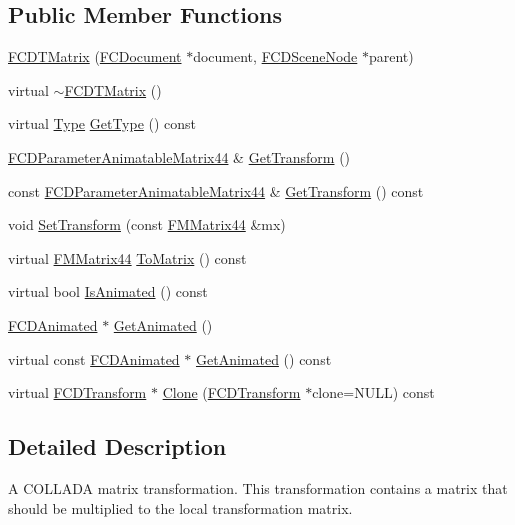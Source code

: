\subsection*{Public Member Functions}
\begin{DoxyCompactItemize}
\item 
\hyperlink{classFCDTMatrix_abfe3f4dfeab74692152c34d2af3e0999}{FCDTMatrix} (\hyperlink{classFCDocument}{FCDocument} $\ast$document, \hyperlink{classFCDSceneNode}{FCDSceneNode} $\ast$parent)
\item 
virtual \hyperlink{classFCDTMatrix_abe118d75966fab2155ac04bf73a4681c}{$\sim$FCDTMatrix} ()
\item 
virtual \hyperlink{classFCDTransform_a13e561c5e53aeaf84dedf4661cdc8921}{Type} \hyperlink{classFCDTMatrix_a73abaf07dc65e188ceb14d49e27355ee}{GetType} () const 
\item 
\hyperlink{classFCDParameterAnimatableT}{FCDParameterAnimatableMatrix44} \& \hyperlink{classFCDTMatrix_a44021172638ab8ae2c1c0c56d2c88ebc}{GetTransform} ()
\item 
const \hyperlink{classFCDParameterAnimatableT}{FCDParameterAnimatableMatrix44} \& \hyperlink{classFCDTMatrix_a09a0316070f5f57d4f59cf25adf4bd64}{GetTransform} () const 
\item 
void \hyperlink{classFCDTMatrix_a9ad2ef293251bedafb477ea7fa624021}{SetTransform} (const \hyperlink{classFMMatrix44}{FMMatrix44} \&mx)
\item 
virtual \hyperlink{classFMMatrix44}{FMMatrix44} \hyperlink{classFCDTMatrix_a26384eeccaa1205b0f88d0ad16134669}{ToMatrix} () const 
\item 
virtual bool \hyperlink{classFCDTMatrix_aaed758f82370d47c82eb66263830d610}{IsAnimated} () const 
\item 
\hyperlink{classFCDAnimated}{FCDAnimated} $\ast$ \hyperlink{classFCDTMatrix_aef3ca1c87d3db3762750154f7dd306e1}{GetAnimated} ()
\item 
virtual const \hyperlink{classFCDAnimated}{FCDAnimated} $\ast$ \hyperlink{classFCDTMatrix_ae2a25b50913ee58bceac42b4aee92029}{GetAnimated} () const 
\item 
virtual \hyperlink{classFCDTransform}{FCDTransform} $\ast$ \hyperlink{classFCDTMatrix_afcd47013f6ef72c4f7b25aafeafd1699}{Clone} (\hyperlink{classFCDTransform}{FCDTransform} $\ast$clone=NULL) const 
\end{DoxyCompactItemize}


\subsection{Detailed Description}
A COLLADA matrix transformation. This transformation contains a matrix that should be multiplied to the local transformation matrix. 

